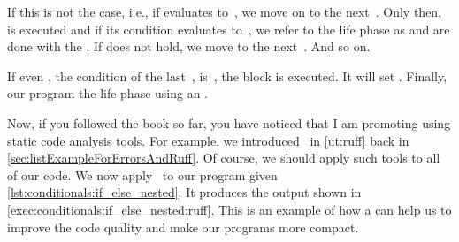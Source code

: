 If this is not the case, i.e., if  evaluates to~, we move on to the next~.
Only then,  is executed and if its condition evaluates to~, we refer to the life phase as  and are done with the .
If  does not hold, we move to the next~.
And so on.

If even , the condition of the last~, is~, the  block is executed.
It will set .
Finally, our program  the life phase using an .

Now, if you followed the book so far, you have noticed that I am promoting using static code analysis tools.
For example, we introduced \ruff\ in \cref{ut:ruff} back in \cref{sec:listExampleForErrorsAndRuff}.
Of course, we should apply such tools to all of our code.
We now apply \ruff\ to our program  given \cref{lst:conditionals:if_else_nested}.
It produces the output shown in \cref{exec:conditionals:if_else_nested:ruff}.
This is an example of how a  can help us to improve the code quality and make our programs more compact.


